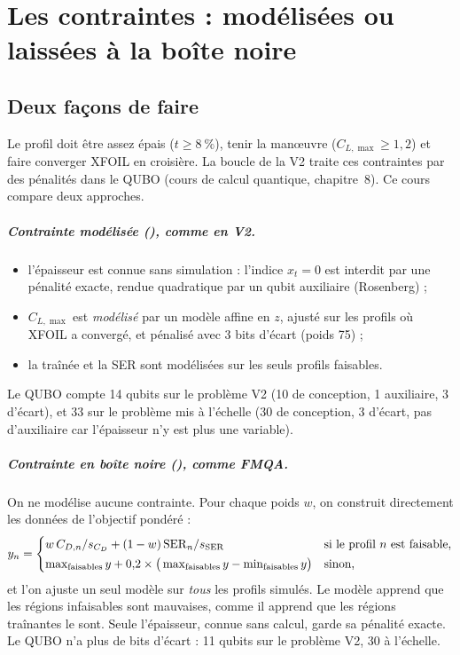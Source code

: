 \chapter{Les contraintes : modélisées ou laissées à la boîte noire}\label{ch:contraintes}

\section{Deux façons de faire}
Le profil doit être assez épais ($t\ge8~\%$), tenir la manœuvre ($C_{L,\max}\ge1{,}2$) et faire converger XFOIL en croisière. La boucle de la V2 traite ces contraintes par des pénalités dans le QUBO (cours de calcul quantique, chapitre~8). Ce cours compare deux approches.

\paragraph{Contrainte modélisée (), comme en V2.}
\begin{itemize}
\item l'épaisseur est connue sans simulation : l'indice $x_t=0$ est interdit par une pénalité exacte, rendue quadratique par un qubit auxiliaire (Rosenberg) ;
\item $C_{L,\max}$ est \emph{modélisé} par un modèle affine en $z$, ajusté sur les profils où XFOIL a convergé, et pénalisé avec 3 bits d'écart (poids 75) ;
\item la traînée et la SER sont modélisées sur les seuls profils faisables.
\end{itemize}
Le QUBO compte 14 qubits sur le problème V2 (10 de conception, 1 auxiliaire, 3 d'écart), et 33 sur le problème mis à l'échelle (30 de conception, 3 d'écart, pas d'auxiliaire car l'épaisseur n'y est plus une variable).

\paragraph{Contrainte en boîte noire (), comme FMQA.} On ne modélise aucune contrainte. Pour chaque poids $w$, on construit directement les données de l'objectif pondéré :
\[ y_n=\begin{cases}w\,C_{D,n}/s_{C_D}+(1-w)\,{\rm SER}_n/s_{\rm SER} & \text{si le profil }n\text{ est faisable,}\\[2pt] \max_{\text{faisables}}y+0{,}2\times\big(\max_{\text{faisables}}y-\min_{\text{faisables}}y\big) & \text{sinon,}\end{cases} \]
et l'on ajuste un seul modèle sur \emph{tous} les profils simulés. Le modèle apprend que les régions infaisables sont mauvaises, comme il apprend que les régions traînantes le sont. Seule l'épaisseur, connue sans calcul, garde sa pénalité exacte. Le QUBO n'a plus de bits d'écart : 11 qubits sur le problème V2, 30 à l'échelle.

